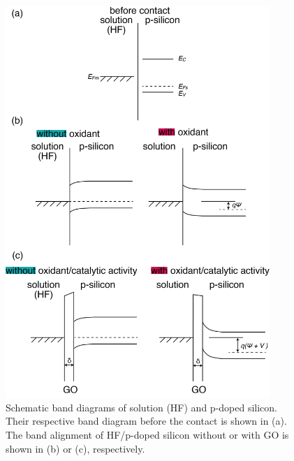 \documentclass[platex,dvipdfmx]{jlreq}			%
\begin{document}
\begin{figure}[H]
    \centering
    \includegraphics[width=100mm]{figures/appendix1.png}
    \caption{Schematic band diagrams of solution (HF) and p-doped silicon. Their respective band diagram before the contact is shown in (a). The band alignment of HF/p-doped silicon without or with GO is shown in (b) or (c), respectively.}
    \label{fig:appendix1}
\end{figure}

\newpage
\printbibliography
\end{document}
